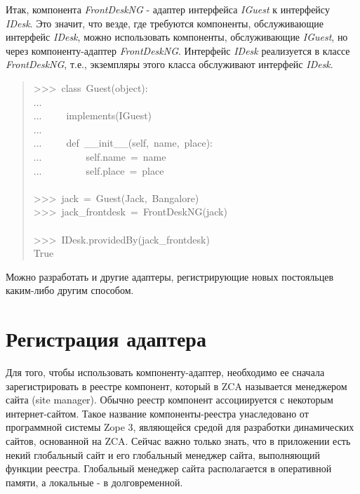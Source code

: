 \documentclass[14pt,a4paper,openany,twoside,final]{extbook}
\providecommand*{\DUroletitlereference}[1]{\textsl{#1}}
\begin{document}
Итак, компонента \DUroletitlereference{FrontDeskNG} - адаптер интерфейса \DUroletitlereference{IGuest} к
интерфейсу \DUroletitlereference{IDesk}.  Это значит, что везде, где требуются компоненты,
обслуживающие интерфейс \DUroletitlereference{IDesk}, можно использовать компоненты,
обслуживающие \DUroletitlereference{IGuest}, но через компоненту-адаптер \DUroletitlereference{FrontDeskNG}.
Интерфейс \DUroletitlereference{IDesk} реализуется в классе \DUroletitlereference{FrontDeskNG}, т.е., экземпляры
этого класса обслуживают интерфейс \DUroletitlereference{IDesk}.

\begin{quote}{\ttfamily \raggedright \noindent
>{}>{}>~class~Guest(object):\\
...\\
...~~~~~implements(IGuest)\\
...\\
...~~~~~def~\_\_init\_\_(self,~name,~place):\\
...~~~~~~~~~self.name~=~name\\
...~~~~~~~~~self.place~=~place\\
~\\
>{}>{}>~jack~=~Guest(\textquotedbl{}Jack\textquotedbl{},~\textquotedbl{}Bangalore\textquotedbl{})\\
>{}>{}>~jack\_frontdesk~=~FrontDeskNG(jack)\\
~\\
>{}>{}>~IDesk.providedBy(jack\_frontdesk)\\
True
}
\end{quote}

Можно разработать и другие адаптеры, регистрирующие новых
постояльцев каким-либо другим способом.


\section{Регистрация адаптера%
  \label{id35}%
}

Для того, чтобы использовать компоненту-адаптер, необходимо ее сначала
зарегистрировать в реестре компонент, который в ZCA называется
менеджером сайта (site manager).  Обычно реестр компонент
ассоциируется с некоторым интернет-сайтом.  Такое название
компоненты-реестра унаследовано от программной системы Zope 3,
являющейся средой для разработки динамических сайтов, основанной на
ZCA.  Сейчас важно только знать, что в приложении есть некий
глобальный сайт и его глобальный менеджер сайта, выполняющий функции
реестра.  Глобальный менеджер сайта располагается в оперативной
памяти, а локальные - в долговременной.
\end{document}
